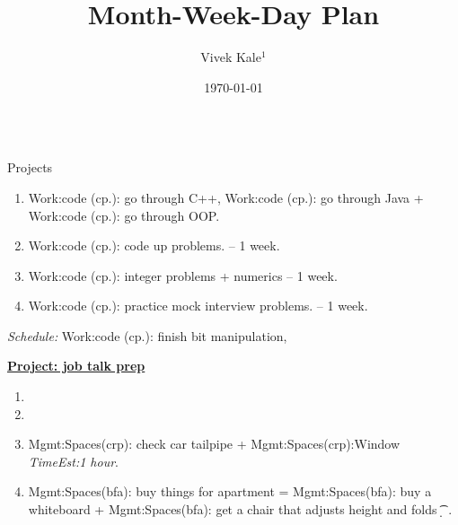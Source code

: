 \documentclass[serif, mathserif, final]{beamer}
\title{Month-Week-Day Plan}\author{Vivek Kale$^1$}\institute{$^1$ University of Illinois at Urbana-Champaign}\date{\today}
\newcommand{\te}[1]{\textit{TimeEst:}\textit{#1}}
\begin{document}
\begin{frame}
\begin{columns}

\begin{column}{0.5\textwidth}
\begin{block}{Projects}
\begin{enumerate}
\tiny \item \tiny Work:code (cp.): go through C++, Work:code (cp.): go through Java + Work:code (cp.): go through OOP. 
\item \tiny Work:code (cp.): code up problems.  – 1 week.
\item \tiny Work:code (cp.): integer problems + numerics   -- 1 week. 
\item \tiny Work:code (cp.): practice mock interview problems. – 1 week. 
\end{enumerate}
{\it Schedule:} Work:code (cp.): finish bit manipulation,


{\underline{\bf Project: job talk prep}}
\begin{enumerate} 
\tiny \item \tiny 
\item \tiny 
\item \tiny Mgmt:Spaces(crp): check car tailpipe +
  Mgmt:Spaces(crp):Window \te{1 hour}.
\item \tiny Mgmt:Spaces(bfa): buy things for apartment =
  Mgmt:Spaces(bfa): buy a whiteboard + Mgmt:Spaces(bfa): get a chair
  that adjusts height and folds \t{} \d{} \p{}. 

\end{enumerate}


\end{block}
\end{column}
\end{columns}
\end{frame}
\end{document}

